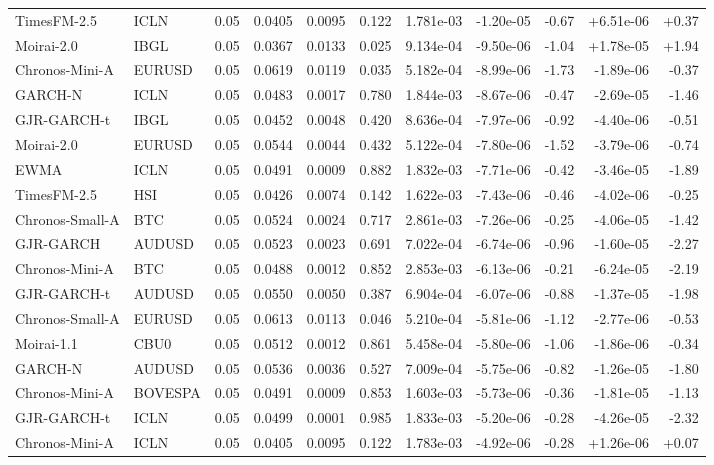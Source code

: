 \begin{tabular}{llrrrrrrrrr}
TimesFM-2.5 & ICLN & 0.05 & 0.0405 & 0.0095 & 0.122 & 1.781e-03 & -1.20e-05 & -0.67 & +6.51e-06 & +0.37 \\
Moirai-2.0 & IBGL & 0.05 & 0.0367 & 0.0133 & 0.025 & 9.134e-04 & -9.50e-06 & -1.04 & +1.78e-05 & +1.94 \\
Chronos-Mini-A & EURUSD & 0.05 & 0.0619 & 0.0119 & 0.035 & 5.182e-04 & -8.99e-06 & -1.73 & -1.89e-06 & -0.37 \\
GARCH-N & ICLN & 0.05 & 0.0483 & 0.0017 & 0.780 & 1.844e-03 & -8.67e-06 & -0.47 & -2.69e-05 & -1.46 \\
GJR-GARCH-t & IBGL & 0.05 & 0.0452 & 0.0048 & 0.420 & 8.636e-04 & -7.97e-06 & -0.92 & -4.40e-06 & -0.51 \\
Moirai-2.0 & EURUSD & 0.05 & 0.0544 & 0.0044 & 0.432 & 5.122e-04 & -7.80e-06 & -1.52 & -3.79e-06 & -0.74 \\
EWMA & ICLN & 0.05 & 0.0491 & 0.0009 & 0.882 & 1.832e-03 & -7.71e-06 & -0.42 & -3.46e-05 & -1.89 \\
TimesFM-2.5 & HSI & 0.05 & 0.0426 & 0.0074 & 0.142 & 1.622e-03 & -7.43e-06 & -0.46 & -4.02e-06 & -0.25 \\
Chronos-Small-A & BTC & 0.05 & 0.0524 & 0.0024 & 0.717 & 2.861e-03 & -7.26e-06 & -0.25 & -4.06e-05 & -1.42 \\
GJR-GARCH & AUDUSD & 0.05 & 0.0523 & 0.0023 & 0.691 & 7.022e-04 & -6.74e-06 & -0.96 & -1.60e-05 & -2.27 \\
Chronos-Mini-A & BTC & 0.05 & 0.0488 & 0.0012 & 0.852 & 2.853e-03 & -6.13e-06 & -0.21 & -6.24e-05 & -2.19 \\
GJR-GARCH-t & AUDUSD & 0.05 & 0.0550 & 0.0050 & 0.387 & 6.904e-04 & -6.07e-06 & -0.88 & -1.37e-05 & -1.98 \\
Chronos-Small-A & EURUSD & 0.05 & 0.0613 & 0.0113 & 0.046 & 5.210e-04 & -5.81e-06 & -1.12 & -2.77e-06 & -0.53 \\
Moirai-1.1 & CBU0 & 0.05 & 0.0512 & 0.0012 & 0.861 & 5.458e-04 & -5.80e-06 & -1.06 & -1.86e-06 & -0.34 \\
GARCH-N & AUDUSD & 0.05 & 0.0536 & 0.0036 & 0.527 & 7.009e-04 & -5.75e-06 & -0.82 & -1.26e-05 & -1.80 \\
Chronos-Mini-A & BOVESPA & 0.05 & 0.0491 & 0.0009 & 0.853 & 1.603e-03 & -5.73e-06 & -0.36 & -1.81e-05 & -1.13 \\
GJR-GARCH-t & ICLN & 0.05 & 0.0499 & 0.0001 & 0.985 & 1.833e-03 & -5.20e-06 & -0.28 & -4.26e-05 & -2.32 \\
Chronos-Mini-A & ICLN & 0.05 & 0.0405 & 0.0095 & 0.122 & 1.783e-03 & -4.92e-06 & -0.28 & +1.26e-06 & +0.07 \\

\end{tabular}

